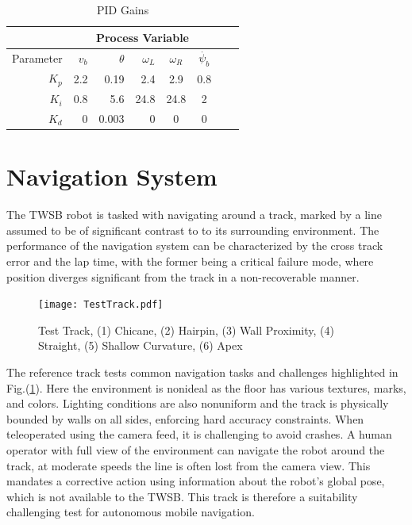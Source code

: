         \begin{table}[H]
            \centering
            \begin{tabular}{|r|r|r|r|c|c|c|c}
                \hline
                & \multicolumn{5}{c|}{Process Variable}  \\
                \hline
                Parameter & $v_b$ & $\theta$  & $\omega_L$ & $\omega_R$ & $\dot{\psi_b}$ \\
                \hline      
                $K_p$ & 2.2 & 0.19 & 2.4 & 2.9 & 0.8 \\
                $K_i$ & 0.8 & 5.6 & 24.8 & 24.8 & 2\\
                $K_d$ & 0 & 0.003 & 0 & 0  &  0\\
                \hline
            \end{tabular}
            \caption{PID Gains}
        \end{table}
      

        \pagebreak{}
        \section{Navigation System}
        The TWSB robot is tasked with navigating around a track, marked by a line assumed to be of significant contrast to to its 
        surrounding environment. The performance of the navigation system can be characterized by the cross track error and the lap time, 
        with the former being a critical failure mode, where position diverges significant from the track in a non-recoverable manner.
        \begin{figure}[H]
            \centering
            \texttt{[image: TestTrack.pdf]}
            \caption{Test Track, (1) Chicane, (2) Hairpin, (3) Wall Proximity, (4) Straight, (5) Shallow Curvature, (6) Apex}
            \label{fig:TestTrack}
        \end{figure}
        The reference track tests common navigation tasks and challenges highlighted in Fig.(\ref{fig:TestTrack}). 
        Here the environment is nonideal as the floor has various textures, marks, and colors.
        Lighting conditions are also nonuniform and the track is physically bounded by walls on all sides, enforcing hard accuracy constraints. 
        When teleoperated using the camera feed, it is challenging to avoid crashes. A human operator with 
        full view of the environment can navigate the robot around the track, at moderate speeds the line is often lost 
        from the camera view. This mandates a corrective action using information about the robot's global pose, 
        which is not available to the TWSB. This track is therefore a suitability challenging test for autonomous mobile navigation.
            
